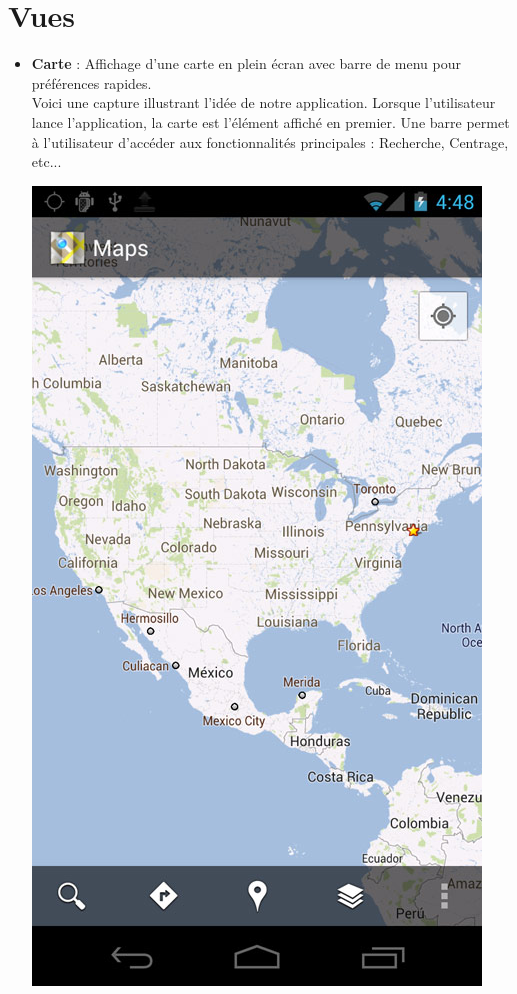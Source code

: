 \documentclass{report}
\begin{document}
	\section*{Vues}
	\begin{itemize}
	\item \textbf{Carte} : Affichage d'une carte en plein écran avec barre de menu pour préférences rapides. \\
	Voici une capture illustrant l'idée de notre application. Lorsque l'utilisateur lance l'application, la carte est l'élément affiché en premier. Une barre permet à l'utilisateur d'accéder aux fonctionnalités principales :  Recherche, Centrage,  etc... \\
		\begin{center}
			\includegraphics[scale=0.35]{map.jpg}

\end{center}
\end{itemize}
\end{document}
